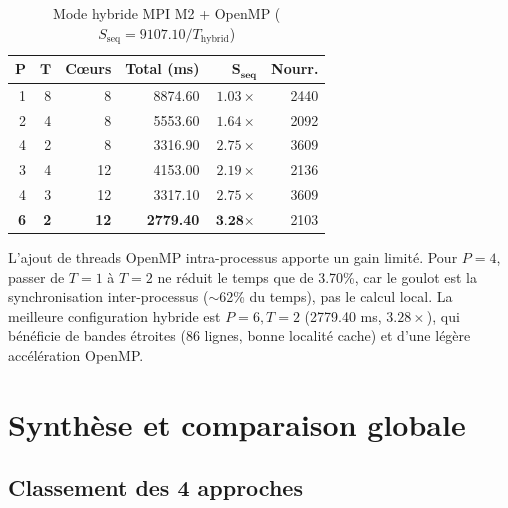 \documentclass[11pt,a4paper]{article}
\begin{document}
\begin{table}[H]
\centering
\begin{tabular}{rrrrrr}
\toprule
$\boldsymbol{P}$ & $\boldsymbol{T}$ & \textbf{Cœurs} & \textbf{Total (ms)} & $\boldsymbol{S_\text{seq}}$ & \textbf{Nourr.} \\
\midrule
1 & 8  & 8  & 8874.60  & $1.03\times$ & 2440 \\
2 & 4  & 8  & 5553.60  & $1.64\times$ & 2092 \\
4 & 2  & 8  & 3316.90  & $2.75\times$ & 3609 \\
3 & 4  & 12 & 4153.00  & $2.19\times$ & 2136 \\
4 & 3  & 12 & 3317.10  & $2.75\times$ & 3609 \\
\textbf{6} & \textbf{2} & \textbf{12} & \textbf{2779.40} & $\textbf{3.28}\times$ & 2103 \\
\bottomrule
\end{tabular}
\caption{Mode hybride MPI M2 + OpenMP ($S_\text{seq} = 9107.10 / T_\text{hybrid}$)}
\label{tab:hybrid}
\end{table}

L'ajout de threads OpenMP intra-processus apporte un gain limité. Pour $P=4$, passer de $T=1$ à $T=2$ ne réduit le temps que de 3.70\%, car le goulot est la synchronisation inter-processus ($\sim$62\% du temps), pas le calcul local. La meilleure configuration hybride est $P=6, T=2$ (2779.40 ms, $3.28\times$), qui bénéficie de bandes étroites (86 lignes, bonne localité cache) et d'une légère accélération OpenMP.


\newpage

\section{Synthèse et comparaison globale}

\subsection{Classement des 4 approches}
\end{document}
